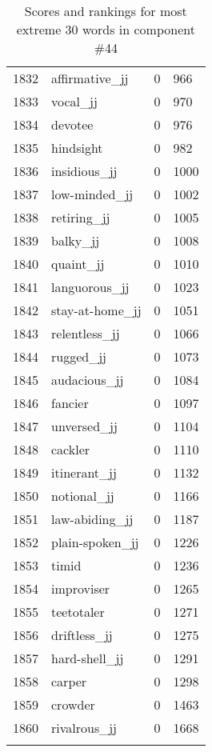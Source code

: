 \begin{longtable}[!htbp]{| rlr@{.}l |}
    1832 & affirmative\_jj & 0 & 966 \\
    1833 & vocal\_jj & 0 & 970 \\
    1834 & devotee & 0 & 976 \\
    1835 & hindsight & 0 & 982 \\
    1836 & insidious\_jj & 0 & 1000 \\
    1837 & low-minded\_jj & 0 & 1002 \\
    1838 & retiring\_jj & 0 & 1005 \\
    1839 & balky\_jj & 0 & 1008 \\
    1840 & quaint\_jj & 0 & 1010 \\
    1841 & languorous\_jj & 0 & 1023 \\
    1842 & stay-at-home\_jj & 0 & 1051 \\
    1843 & relentless\_jj & 0 & 1066 \\
    1844 & rugged\_jj & 0 & 1073 \\
    1845 & audacious\_jj & 0 & 1084 \\
    1846 & fancier & 0 & 1097 \\
    1847 & unversed\_jj & 0 & 1104 \\
    1848 & cackler & 0 & 1110 \\
    1849 & itinerant\_jj & 0 & 1132 \\
    1850 & notional\_jj & 0 & 1166 \\
    1851 & law-abiding\_jj & 0 & 1187 \\
    1852 & plain-spoken\_jj & 0 & 1226 \\
    1853 & timid & 0 & 1236 \\
    1854 & improviser & 0 & 1265 \\
    1855 & teetotaler & 0 & 1271 \\
    1856 & driftless\_jj & 0 & 1275 \\
    1857 & hard-shell\_jj & 0 & 1291 \\
    1858 & carper & 0 & 1298 \\
    1859 & crowder & 0 & 1463 \\
    1860 & rivalrous\_jj & 0 & 1668 \\
    \hline
    \caption{Scores and rankings for most extreme 30 words in component \#44} \\
\end{longtable}
